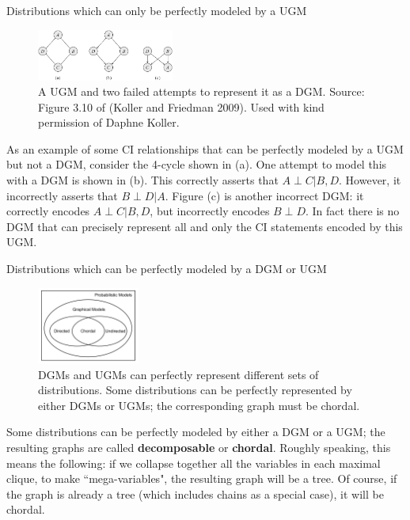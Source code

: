 \documentclass[10pt,mathserif]{beamer}
\begin{document}
\begin{frame}{Distributions which can only be perfectly modeled by a UGM}
\begin{figure}[h]
\centering     %
\includegraphics[width=0.4\textwidth]{koller-3-10}
\caption{A UGM and two failed attempts to represent it as a DGM. Source: Figure 3.10 of (Koller and Friedman 2009). Used with kind permission of Daphne Koller.}
\end{figure}

As an example of some CI relationships that can be perfectly modeled by a UGM but not a DGM, consider the 4-cycle shown in (a). One attempt to model this with a DGM is shown in (b). This correctly asserts that $A \perp C|B,D$. However, it incorrectly asserts that $B \perp D|A$. Figure (c) is another incorrect DGM: it correctly encodes $A \perp C|B,D$, but incorrectly encodes $B \perp D$. In fact there is no DGM that can precisely represent all and only the CI statements encoded by this UGM.
\end{frame}

\begin{frame}{Distributions which can be perfectly modeled by a DGM or UGM}
\begin{figure}[h]
\centering     %
\includegraphics[width=0.3\textwidth]{GMvenn}
\caption{DGMs and UGMs can perfectly represent different sets of distributions. Some distributions can be perfectly represented by either DGMs or UGMs; the corresponding graph must be chordal.}
\end{figure}

Some distributions can be perfectly modeled by either a DGM or a UGM; the resulting graphs are called \textbf{decomposable} or \textbf{chordal}. Roughly speaking, this means the following: if we collapse together all the variables in each maximal clique, to make ``mega-variables", the resulting graph will be a tree. Of course, if the graph is already a tree (which includes chains as a special case), it will be chordal.
\end{frame}
\end{document}
